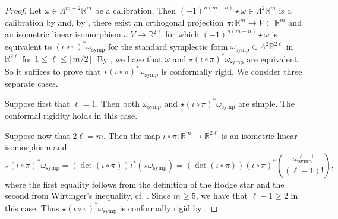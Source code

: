 \documentclass[a4paper,leqno,11pt]{amsart}
\numberwithin{equation}{section}
\theoremstyle{remark}
\theoremstyle{remark}
\newcommand{\R}{\mathbb{R}}
\newcommand{\symp}{\mathrm{symp}}
\begin{document}
\codimMobius*

\begin{proof}
Let $\omega\in \Lambda^{m-2}\R^m$ be a calibration. Then $(-1)^{ n(m-n) }\star \omega \in \Lambda^2 \R^m$ is a calibration by  and, by , there exist an orthogonal projection $\pi \colon \R^m \to V \subset \R^m$ and an isometric linear isomorphism $\iota \colon V \to \mathbb{R}^{2\ell}$ for which $(-1)^{ n(m-n) }\star \omega$ is equivalent to $( \iota \circ \pi )^{*} \omega_{\symp}$ for the standard symplectic form $\omega_\symp \in \Lambda^2 \R^{2\ell}$ in $\R^{2\ell}$ for $1 \le \ell \le \lfloor m/2 \rfloor$. By , we have that $\omega$ and $\star ( \iota \circ \pi )^{*}\omega_{\symp}$ are equivalent. So it suffices to prove that $\star ( \iota \circ \pi )^{*}\omega_{\symp}$ is conformally rigid. We consider three separate cases.

Suppose first that $\ell = 1$. Then both $\omega_{\symp}$ and $\star ( \iota \circ \pi )^{*}\omega_{\symp}$ are simple. The conformal rigidity holds in this case. 

Suppose now that $2 \ell = m$. Then the map $\iota \circ \pi \colon \R^m \to \R^{2\ell}$ is an isometric linear isomorphism and 
\begin{equation*}
    \star ( \iota \circ \pi )^{*}\omega_{\symp} = ( \det ( \iota \circ \pi ) )\iota^{*}( \star \omega_{\symp} ) = ( \det ( \iota \circ \pi ) )( \iota \circ \pi )^{*}\left( \frac{ \omega_{\symp}^{ \ell -1  } }{ (\ell - 1)! } \right),
\end{equation*}
where the first equality follows from the definition of the Hodge star and the second from Wirtinger's inequality, cf. . Since $m\ge 5$, we have that $\ell-1\ge 2$ in this case. Thus $\star ( \iota \circ \pi )^{*}\omega_{\symp}$ is conformally rigid by .


\end{proof}
\end{document}
